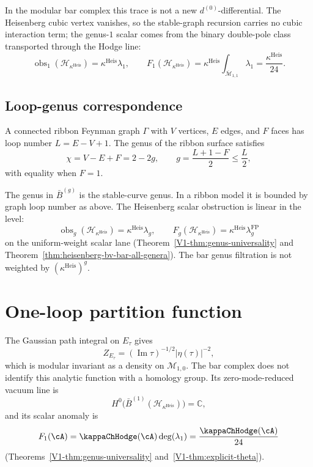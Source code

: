 \begin{center}
\end{center}

In the modular bar complex this trace is not a new
$d^{(0)}$-differential.  The Heisenberg cubic vertex vanishes, so the
stable-graph recursion carries no cubic interaction term; the genus-$1$
scalar comes from the binary double-pole class transported through
the Hodge line:
\[
\operatorname{obs}_1(\mathcal{H}_{\kappa^{\mathrm{Heis}}})
= \kappa^{\mathrm{Heis}}\lambda_1,\qquad
F_1(\mathcal{H}_{\kappa^{\mathrm{Heis}}})
= \kappa^{\mathrm{Heis}}
\int_{\overline{\mathcal{M}}_{1,1}}\lambda_1
= \frac{\kappa^{\mathrm{Heis}}}{24}.
\]

\subsection{Loop-genus correspondence}

\begin{theorem}
\label{thm:loop-genus-correspondence}
A connected ribbon Feynman graph $\Gamma$ with $V$ vertices, $E$ edges,
and $F$ faces has loop number $L=E-V+1$.  The genus of the ribbon
surface satisfies
\[
\chi=V-E+F=2-2g,\qquad
g=\frac{L+1-F}{2}\leq \frac{L}{2},
\]
with equality when $F=1$.
\end{theorem}

The genus in $\bar{B}^{(g)}$ is the stable-curve genus.  In a ribbon
model it is bounded by graph loop number as above. The
Heisenberg scalar obstruction is linear in the level:
\[
\operatorname{obs}_g(\mathcal{H}_{\kappa^{\mathrm{Heis}}})
= \kappa^{\mathrm{Heis}}\lambda_g,\qquad
F_g(\mathcal{H}_{\kappa^{\mathrm{Heis}}})
= \kappa^{\mathrm{Heis}}\lambda_g^{\mathrm{FP}}
\]
on the uniform-weight scalar lane
(Theorem~\ref{V1-thm:genus-universality} and
Theorem~\ref{thm:heisenberg-bv-bar-all-genera}).  The bar genus
filtration is not weighted by
$(\kappa^{\mathrm{Heis}})^g$.

\section{One-loop partition function}

The Gaussian path integral on $E_\tau$ gives
\[
Z_{E_\tau}=(\operatorname{Im}\tau)^{-1/2}|\eta(\tau)|^{-2},
\]
which is modular invariant as a density on $\mathcal{M}_{1,0}$.  The
bar complex does not identify this analytic function with a homology
group.  Its zero-mode-reduced vacuum line is
\[
H^0\bigl(\bar{B}^{(1)}
(\mathcal{H}_{\kappa^{\mathrm{Heis}}})\bigr)=\mathbb{C},
\]
and its scalar anomaly is
\[
F_1(\cA)=\kappaChHodge(\cA)\deg(\lambda_1)=\frac{\kappaChHodge(\cA)}{24}
\]
(Theorems~\ref{V1-thm:genus-universality}
and~\ref{V1-thm:explicit-theta}).

